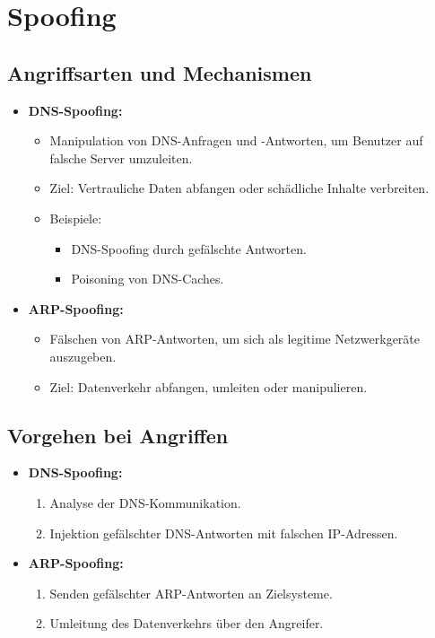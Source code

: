 \documentclass{article}
\begin{document}

\section{Spoofing}

\subsection{Angriffsarten und Mechanismen}
\begin{itemize}
    \item \textbf{DNS-Spoofing:}
    \begin{itemize}
        \item Manipulation von DNS-Anfragen und -Antworten, um Benutzer auf falsche Server umzuleiten.
        \item Ziel: Vertrauliche Daten abfangen oder schädliche Inhalte verbreiten.
        \item Beispiele:
        \begin{itemize}
            \item DNS-Spoofing durch gefälschte Antworten.
            \item Poisoning von DNS-Caches.
        \end{itemize}
    \end{itemize}
    \item \textbf{ARP-Spoofing:}
    \begin{itemize}
        \item Fälschen von ARP-Antworten, um sich als legitime Netzwerkgeräte auszugeben.
        \item Ziel: Datenverkehr abfangen, umleiten oder manipulieren.
    \end{itemize}
\end{itemize}

\subsection{Vorgehen bei Angriffen}
\begin{itemize}
    \item \textbf{DNS-Spoofing:}
    \begin{enumerate}
        \item Analyse der DNS-Kommunikation.
        \item Injektion gefälschter DNS-Antworten mit falschen IP-Adressen.
    \end{enumerate}
    \item \textbf{ARP-Spoofing:}
    \begin{enumerate}
        \item Senden gefälschter ARP-Antworten an Zielsysteme.
        \item Umleitung des Datenverkehrs über den Angreifer.
    \end{enumerate}
\end{itemize}
\end{document}
